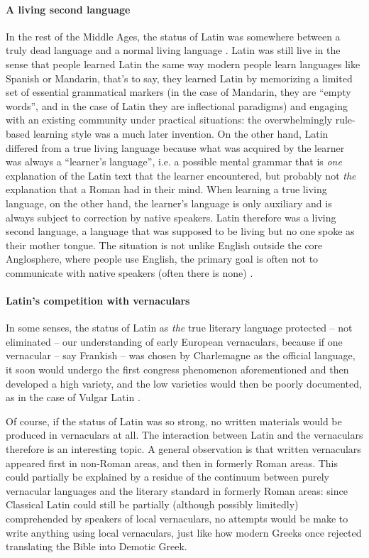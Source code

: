 \documentclass[a4paper, oneside, 12pt]{report}
\newcommand*{\citepage}[1]{p.~{#1}}
\newcommand*{\citepages}[1]{pp.~{#1}}
\begin{document}
\paragraph*{A living second language}
In the rest of the Middle Ages,
the status of Latin was somewhere between a truly dead language and a normal living language
\citep[\citepage{145-150}]{leonhardt2013latin}.
Latin was still live in the sense that
people learned Latin the same way modern people learn languages like Spanish or Mandarin,
that's to say, they learned Latin by memorizing a limited set of essential grammatical markers
(in the case of Mandarin, they are ``empty words'',
and in the case of Latin they are inflectional paradigms)
and engaging with an existing community under practical situations:
the overwhelmingly rule-based learning style was a much later invention.
On the other hand, Latin differed from a true living language
because what was acquired by the learner was always a ``learner's language'',
i.e. a possible mental grammar that is \emph{one} explanation 
of the Latin text that the learner encountered,
but probably not \emph{the} explanation that a Roman had in their mind.
When learning a true living language, on the other hand,
the learner's language is only auxiliary and is always subject to correction by native speakers.
Latin therefore was a living second language,
a language that was supposed to be living but no one spoke as their mother tongue.
The situation is not unlike English outside the core Anglosphere,
where people use English, the primary goal is often not to communicate with native speakers 
(often there is none)
\citep[\citepages{150-154}]{leonhardt2013latin}.

\paragraph*{Latin's competition with vernaculars}
In some senses, the status of Latin as \emph{the} true literary language
protected -- not eliminated -- our understanding of early European vernaculars,
because if one vernacular -- say Frankish -- was chosen by Charlemagne as the official language,
it soon would undergo the first congress phenomenon aforementioned
and then developed a high variety,
and the low varieties would then be poorly documented,
as in the case of Vulgar Latin
\citep[\citepages{143-144}]{leonhardt2013latin}.

Of course, if the status of Latin was so strong,
no written materials would be produced in vernaculars at all.
The interaction between Latin and the vernaculars therefore is an interesting topic.
A general observation is that written vernaculars appeared first in non-Roman areas,
and then in formerly Roman areas.
This could partially be explained by a residue of the continuum between 
purely vernacular languages and the literary standard in formerly Roman areas:
since Classical Latin could still be partially (although possibly limitedly) comprehended 
by speakers of local vernaculars,
no attempts would be make to write anything using local vernaculars,
just like how modern Greeks once rejected translating the Bible into Demotic Greek.
\end{document}
